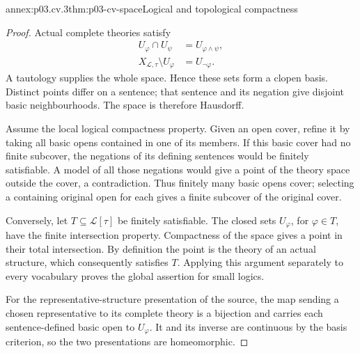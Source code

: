 \begin{annexitem}{annex:p03.cv.3}{thm:p03-cv-space}{Logical and topological compactness}
\begin{proof}
Actual complete theories satisfy
\[
 \begin{aligned}
 U_\varphi\cap U_\psi&=U_{\varphi\land\psi},\\
 X_{\mathscr L,\tau}\setminus U_\varphi&=U_{\neg\varphi}.
 \end{aligned}
\]
A tautology supplies the whole space. Hence these sets form a
clopen basis. Distinct points differ on a sentence; that sentence
and its negation give disjoint basic neighbourhoods. The space
is therefore Hausdorff.

Assume the local logical compactness property. Given an open cover,
refine it by taking all basic opens contained in one of its members.
If this basic cover had no finite subcover, the negations of its
defining sentences would be finitely satisfiable. A model of all
those negations would give a point of the theory space outside
the cover, a contradiction. Thus finitely many basic opens cover;
selecting a containing original open for each gives a finite
subcover of the original cover.

Conversely, let \(T\subseteq\mathscr L[\tau]\) be finitely
satisfiable. The closed sets \(U_\varphi\), for \(\varphi\in T\),
have the finite intersection property. Compactness of the space
gives a point in their total intersection. By definition the point
is the theory of an actual structure, which consequently satisfies
\(T\). Applying this argument separately to every vocabulary
proves the global assertion for small logics.

For the representative-structure presentation of the source, the
map sending a chosen representative to its complete theory is a
bijection and carries each sentence-defined basic open to
\(U_\varphi\). It and its inverse are continuous by the basis
criterion, so the two presentations are homeomorphic.
\end{proof}
\end{annexitem}


